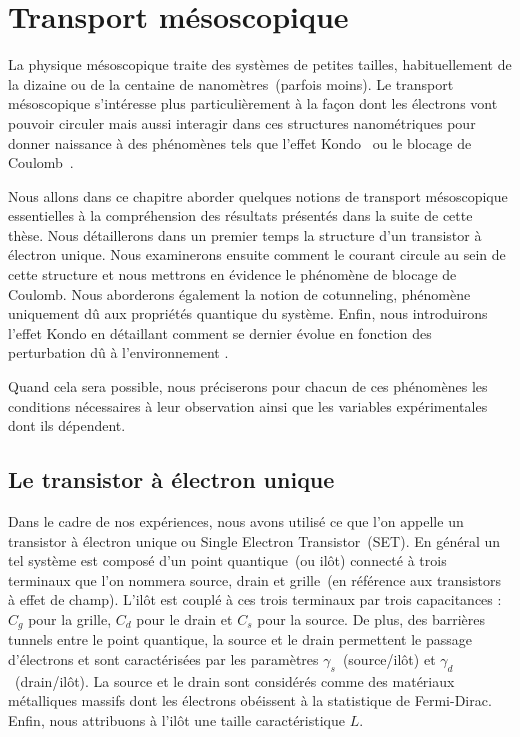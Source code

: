 \chapter{Transport mésoscopique}

La physique mésoscopique traite des systèmes de petites tailles, habituellement de la dizaine ou de la centaine de nanomètres~(parfois moins). Le transport mésoscopique s'intéresse plus particulièrement à la façon dont les électrons vont pouvoir circuler mais aussi interagir dans ces structures nanométriques pour donner naissance à des phénomènes tels que l'effet Kondo~\cite{JKondo1} ou le blocage de Coulomb~\cite{Beenakker1991}. 

Nous allons dans ce chapitre aborder quelques notions de transport mésoscopique essentielles à la compréhension des résultats présentés dans la suite de cette thèse. Nous détaillerons dans un premier temps la structure d'un transistor à électron unique. Nous examinerons ensuite comment le courant circule au sein de cette structure et nous mettrons en évidence le phénomène de blocage de Coulomb. Nous aborderons également la notion de cotunneling, phénomène uniquement dû aux propriétés quantique du système. Enfin, nous introduirons l'effet Kondo en détaillant comment se dernier évolue en fonction des perturbation dû à l'environnement .

Quand cela sera possible, nous préciserons pour chacun de ces phénomènes les conditions nécessaires à leur observation ainsi que les variables expérimentales dont ils dépendent.


\section{Le transistor à électron unique}
Dans le cadre de nos expériences, nous avons utilisé ce que l'on appelle un transistor à électron unique ou Single Electron Transistor~(SET). En général un tel système est composé d'un point quantique~(ou ilôt) connecté à trois terminaux que l'on nommera source, drain et grille~(en référence aux transistors à effet de champ). L'il\^ot est couplé à ces trois terminaux par trois capacitances : $C_g$ pour la grille, $C_d$ pour le drain et $C_s$ pour la source. De plus, des barrières tunnels entre le point quantique, la source et le drain permettent le passage d'électrons et sont caractérisées par les paramètres $\gamma_s$~(source/il\^ot) et $\gamma_d$~(drain/il\^ot). La source et le drain sont considérés comme des matériaux métalliques massifs dont les électrons obéissent à la statistique de Fermi-Dirac. Enfin, nous attribuons à l'il\^ot une taille caractéristique $L$. 

